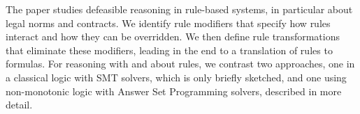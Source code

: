 The paper studies defeasible reasoning in rule-based systems, in particular
about legal norms and contracts. We identify rule modifiers that specify how
rules interact and how they can be overridden. We then define rule
transformations that eliminate these modifiers, leading in the end to a
translation of rules to formulas. For reasoning with and about rules, we
contrast two approaches, one in a classical logic with SMT solvers, which is
only briefly sketched, and one using non-monotonic logic with Answer Set
Programming solvers, described in more detail.

